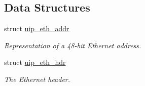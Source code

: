 \subsection*{Data Structures}
\begin{CompactItemize}
\item 
struct \hyperlink{a00029}{uip\_\-eth\_\-addr}
\begin{CompactList}\small\item\em Representation of a 48-bit Ethernet address. \item\end{CompactList}\item 
struct \hyperlink{a00030}{uip\_\-eth\_\-hdr}
\begin{CompactList}\small\item\em The Ethernet header. \item\end{CompactList}\end{CompactItemize}
